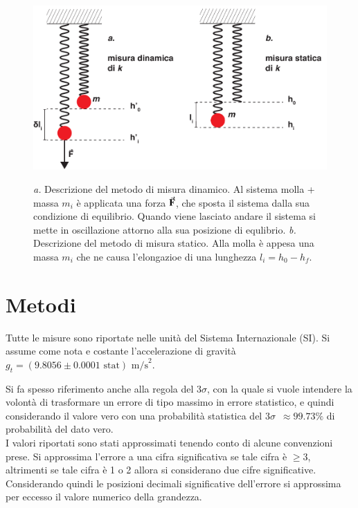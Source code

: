 \documentclass[italian, a4paper, 10pt, twocolumn]{../../style/lab_unige}
\newcommand{\gLab}{$g_t=(9.8056\pm0.0001 \text{ stat}) \text{ m/s}^2$\space}
\newcommand{\treSigma}{$3\sigma$\space}
\newcommand{\Li}[1]{$l_{#1}$}
\newcommand{\MassI}[1]{$m_{#1}$}
\begin{document}
    \begin{figure}[t]
        \centering
        \includegraphics[width=\linewidth]{system_horiz.pdf}
        \label{figure:methods}
        \caption{\textit{a.} Descrizione del metodo di misura dinamico. Al sistema molla + massa \MassI{i} è 
        applicata una forza $\va{F}$, che sposta il sistema dalla sua condizione di equilibrio. Quando viene 
        lasciato andare il sistema si mette in oscillazione attorno alla sua posizione di equlibrio.
        \textit{b.} Descrizione del metodo di misura statico. Alla molla è appesa una massa \MassI{i} che 
        ne causa l'elongazioe di una lunghezza \Li{i}$=h_0-h_f$. 
        }
    \end{figure}

    \section{Metodi}
    \label{section:methods}
    Tutte le misure sono riportate nelle unità del Sistema Internazionale (SI). Si assume come nota e costante 
    l'accelerazione di gravità \gLab .

    
    Si fa spesso riferimento anche alla regola del \treSigma, con la quale si vuole intendere la volontà di 
    trasformare un errore di tipo massimo in errore statistico, e quindi considerando il valore vero con una
    probabilità statistica del \treSigma~$\approx99.73\%$ di probabilità del dato vero.\\
    I valori riportati sono stati approssimati tenendo conto di alcune convenzioni prese. Si approssima 
    l'errore a una cifra significativa se tale cifra è $\geqslant3$, altrimenti se tale cifra è 1 o 2 allora
    si considerano due cifre significative. Considerando quindi le posizioni decimali significative dell'errore
    si approssima per eccesso il valore numerico della grandezza. 
\end{document}
